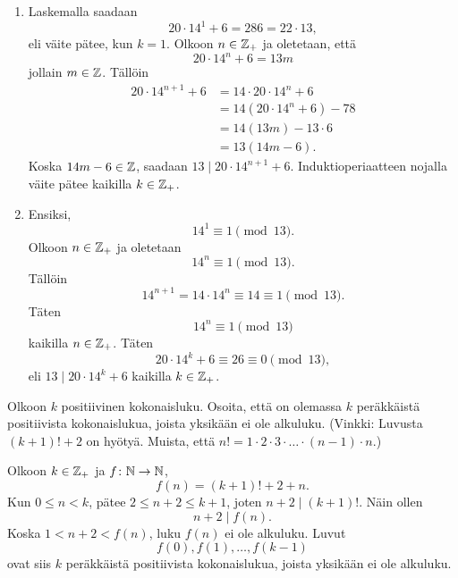 \documentclass[11pt,a4paper]{amsart}
\begin{document}
\begin{solution}
  \leavevmode\par
  \begin{enumerate}[label=(\alph*), nosep]
    \item Laskemalla saadaan
      \[
        20\cdot 14^1 + 6 = 286 = 22\cdot 13,
      \]
      eli väite pätee, kun \(k = 1\). Olkoon \(n \in \mathbb{Z}_+\) ja oletetaan, että
      \[
        20 \cdot 14^n + 6 = 13m
      \]
      jollain \(m \in \mathbb{Z}\). Tällöin
      \[
        \begin{aligned}
          20 \cdot 14^{n + 1} + 6 &= 14\cdot 20 \cdot 14^n + 6 \\
          &= 14(20\cdot 14^n + 6) - 78 \\
          &= 14(13m) - 13\cdot 6 \\
          &= 13(14m - 6).
        \end{aligned}
      \]
      Koska \(14m - 6 \in \mathbb{Z}\), saadaan \(13 \mid 20 \cdot 14^{n + 1} + 6\).
      Induktioperiaatteen nojalla väite pätee kaikilla \(k \in \mathbb{Z}_+\).
    \item Ensiksi,
      \[
        14^1 \equiv 1 \pmod{13}.
      \]
      Olkoon \(n \in \mathbb{Z}_+\) ja oletetaan
      \[
        14^n \equiv 1 \pmod{13}.
      \]
      Tällöin
      \[
        14^{n + 1} = 14\cdot 14^n \equiv 14 \equiv 1 \pmod{13}.
      \]
      Täten
      \[
        14^n \equiv 1 \pmod{13}
      \]
      kaikilla \(n \in \mathbb{Z}_+\). Täten
      \[
        20 \cdot 14^k + 6 \equiv 26 \equiv 0 \pmod{13},
      \]
      eli \(13 \mid 20 \cdot 14^k + 6\) kaikilla \(k \in \mathbb{Z}_+\).
  \end{enumerate}
\end{solution}

\begin{exercise}
  Olkoon \(k\) positiivinen kokonaisluku. Osoita, että on olemassa \(k\)
  peräkkäistä positiivista kokonaislukua, joista yksikään ei ole alkuluku.
  (Vinkki: Luvusta \((k + 1)! + 2\) on hyötyä. Muista, että
  \(n! = 1 \cdot 2 \cdot 3 \cdot \ldots \cdot (n - 1) \cdot n\).)
\end{exercise}

\begin{solution}
  Olkoon \(k \in \mathbb{Z}_+\) ja \(f \colon \mathbb{N} \to \mathbb{N}\),
  \[
    f(n) = (k + 1)! + 2 + n.
  \]
  Kun \(0 \leq n < k\), pätee \(2 \leq n + 2 \leq k + 1\), joten
  \(n + 2 \mid (k + 1)!\). Näin ollen
  \[
    n + 2 \mid f(n).
  \]
  Koska \(1 < n + 2 < f(n)\), luku \(f(n)\) ei ole alkuluku.
  Luvut
  \[
    f(0), f(1), \ldots, f(k-1)
  \]
  ovat siis \(k\) peräkkäistä positiivista kokonaislukua, joista
  yksikään ei ole alkuluku.
\end{solution}
\end{document}
